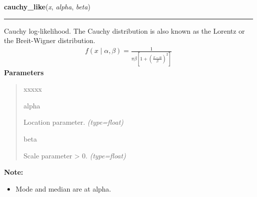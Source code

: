 \hspace{.8\funcindent}\begin{boxedminipage}{\funcwidth}

    \raggedright \textbf{cauchy\_like}(\textit{x}, \textit{alpha}, \textit{beta})

    \vspace{-1.5ex}

    \rule{\textwidth}{0.5\fboxrule}
\setlength{\parskip}{2ex}

Cauchy log-likelihood. The Cauchy distribution is also known as the
Lorentz or the Breit-Wigner distribution.
\begin{equation*}\begin{split}f(x \mid \alpha, \beta) = \frac{1}{\pi \beta [1 + (\frac{x-\alpha}{\beta})^2]}\end{split}\end{equation*}\setlength{\parskip}{1ex}
      \textbf{Parameters}
      \vspace{-1ex}

      \begin{quote}
        \begin{Ventry}{xxxxx}

          \item[alpha]


Location parameter.
            {\it (type=float)}

          \item[beta]


Scale parameter {\textgreater} 0.
            {\it (type=float)}

        \end{Ventry}

      \end{quote}

\textbf{Note:} \begin{itemize}
\item {} 
Mode and median are at alpha.

\end{itemize}


    \end{boxedminipage}

    \label{pymc:distributions:chi2_like}

    \vspace{0.5ex}

